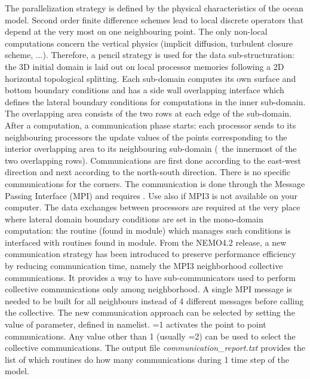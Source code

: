 \documentclass[../main/NEMO_manual]{subfiles}
\begin{document}
The parallelization strategy is defined by the physical characteristics of the ocean model.
Second order finite difference schemes lead to local discrete operators that
depend at the very most on one neighbouring point.
The only non-local computations concern the vertical physics
(implicit diffusion, turbulent closure scheme, ...).
Therefore, a pencil strategy is used for the data sub-structuration:
the 3D initial domain is laid out on local processor memories following a 2D horizontal topological splitting.
Each sub-domain computes its own surface and bottom boundary conditions and
has a side wall overlapping interface which defines the lateral boundary conditions for
computations in the inner sub-domain.
The overlapping area consists of the two rows at each edge of the sub-domain.
After a computation, a communication phase starts:
each processor sends to its neighbouring processors the update values of the points corresponding to
the interior overlapping area to its neighbouring sub-domain (\ie\ the innermost of the two overlapping rows).
Communications are first done according to the east-west direction and next according to the north-south direction.
There is no specific communications for the corners.
The communication is done through the Message Passing Interface (MPI) and requires .
Use also  if MPI3 is not available on your computer.
The data exchanges between processors are required at the very place where
lateral domain boundary conditions are set in the mono-domain computation:
the  routine (found in  module) which manages such conditions is interfaced with
routines found in  module.
From the NEMO4.2 release, a new communication strategy has been introduced to preserve performance efficiency
by reducing communication time, namely the MPI3 neighborhood collective communications.
It provides a way to have sub-communicators used to perform collective communications only among neighborhood.
A single MPI message is needed to be built for all neighbours instead of 4 different messages before calling the collective.
The new communication approach can be selected by setting the value of  parameter, defined in  namelist.
=1 activates the point to point communications.
Any value other than 1 (usually =2) can be used to select the collective communications.
The output file \textit{communication\_report.txt} provides the list of which routines do how
many communications during 1 time step of the model.\\
\end{document}
